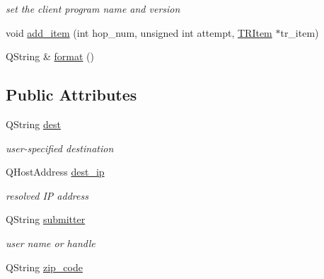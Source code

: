 \begin{CompactItemize}
\begin{CompactList}\small\item\em set the client program name and version \item\end{CompactList}\item 
void \hyperlink{classTraceroute_00408735f9ec52c676aca621945a4397}{add\_\-item} (int hop\_\-num, unsigned int attempt, \hyperlink{classTRItem}{TRItem} $\ast$tr\_\-item)
\item 
QString \& \hyperlink{classTraceroute_3360e93e25f81e6cc4aaa03a8a3507ba}{format} ()
\end{CompactItemize}
\subsection*{Public Attributes}
\begin{CompactItemize}
\item 
\hypertarget{classTraceroute_b045e5f196f24f4a3c606e0b834dbe2d}{
QString \hyperlink{classTraceroute_b045e5f196f24f4a3c606e0b834dbe2d}{dest}}
\label{classTraceroute_b045e5f196f24f4a3c606e0b834dbe2d}

\begin{CompactList}\small\item\em user-specified destination \item\end{CompactList}\item 
\hypertarget{classTraceroute_4266d652220298885707ac2982b6cb98}{
QHostAddress \hyperlink{classTraceroute_4266d652220298885707ac2982b6cb98}{dest\_\-ip}}
\label{classTraceroute_4266d652220298885707ac2982b6cb98}

\begin{CompactList}\small\item\em resolved IP address \item\end{CompactList}\item 
\hypertarget{classTraceroute_eafa630c4871ad2ac89fce1aa75fe6e0}{
QString \hyperlink{classTraceroute_eafa630c4871ad2ac89fce1aa75fe6e0}{submitter}}
\label{classTraceroute_eafa630c4871ad2ac89fce1aa75fe6e0}

\begin{CompactList}\small\item\em user name or handle \item\end{CompactList}\item 
\hypertarget{classTraceroute_b9954b9da10cad44d5a736bacef0ab05}{
QString \hyperlink{classTraceroute_b9954b9da10cad44d5a736bacef0ab05}{zip\_\-code}}
\label{classTraceroute_b9954b9da10cad44d5a736bacef0ab05}


\end{CompactItemize}

